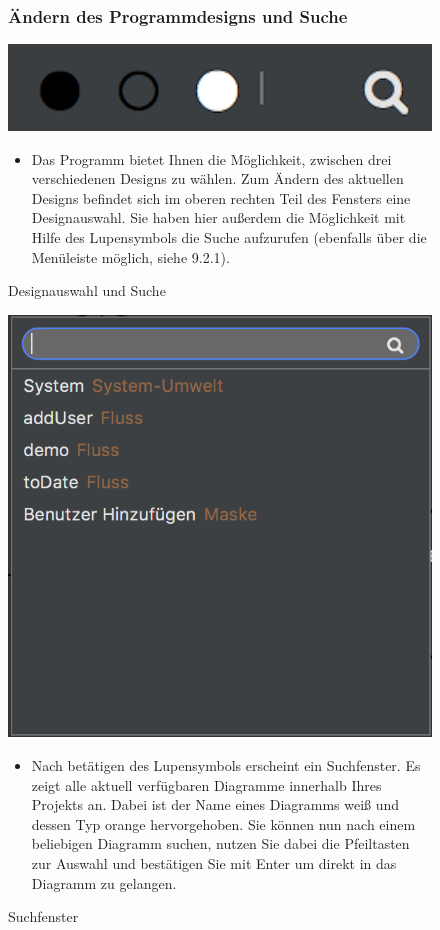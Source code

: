 \begin{figure}[h!]
\subsubsection{Ändern des Programmdesigns und Suche}
	\centering
	\includegraphics[width=.4\textwidth]{Design_Aendern.png}
	\caption{Designauswahl und Suche}
\begin{itemize}	
\item Das Programm bietet Ihnen die Möglichkeit, zwischen drei verschiedenen Designs zu wählen. Zum Ändern des aktuellen Designs befindet sich im oberen rechten Teil des Fensters eine Designauswahl. Sie haben hier außerdem die Möglichkeit mit Hilfe des Lupensymbols die Suche aufzurufen (ebenfalls über die Menüleiste möglich, siehe 9.2.1).
\end{itemize}
\end{figure}

\begin{figure}[h!]
	\centering
	\includegraphics[width=.45\textwidth]{Search.png}
	\caption{Suchfenster}
\begin{itemize}	
\item Nach betätigen des Lupensymbols erscheint ein Suchfenster. Es zeigt alle aktuell verfügbaren Diagramme innerhalb Ihres Projekts an. Dabei ist der Name eines Diagramms weiß und dessen Typ orange hervorgehoben. Sie können nun nach einem beliebigen Diagramm suchen, nutzen Sie dabei die Pfeiltasten zur Auswahl und bestätigen Sie mit Enter um direkt in das Diagramm zu gelangen.
\end{itemize}
\end{figure}

